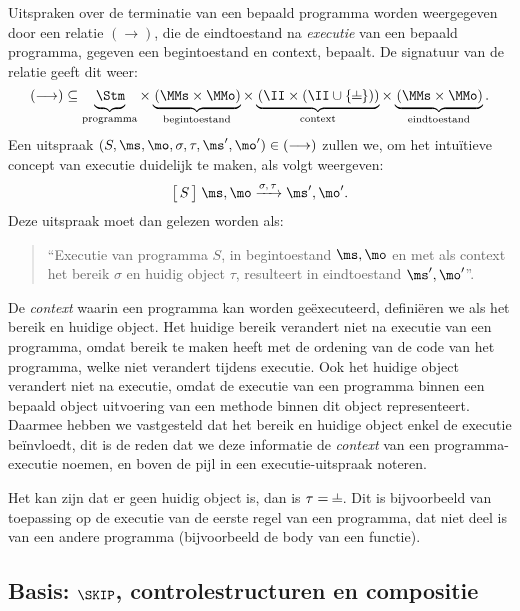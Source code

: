 Uitspraken over de terminatie van een bepaald programma worden weergegeven door een relatie $(\longrightarrow)$, die de eindtoestand na \emph{executie} van een bepaald programma, gegeven een begintoestand en context, bepaalt. De signatuur van de relatie geeft dit weer:
%
\begin{equation*}
  (\longrightarrow)
  \subseteq
  \underbrace{\phantom{|}\!\Stm}_\text{programma} \times
  \underbrace{\phantom{|}\!(\MMs \times \MMo)}_\text{begintoestand} \times
  \underbrace{\phantom{|}\!(\II \times (\II \cup \{\nil\}))}_\text{context} \times
  \underbrace{\phantom{|}\!(\MMs \times \MMo)}_\text{eindtoestand}
  .
\end{equation*}
%
Een uitspraak $(S,\ms,\mo,\sigma,\tau, \ms',\mo') \in (\longrightarrow)$ zullen we, om het intuïtieve concept van executie duidelijk te maken, als volgt weergeven:
%
\begin{equation*}
  \Terminates{S}{\ms,\mo}{\sigma,\tau}{\ms',\mo'}.
\end{equation*}
%
Deze uitspraak moet dan gelezen worden als:

\begin{quote}
  ``Executie van programma $S$, in begintoestand $\ms, \mo$ en met als context het bereik $\sigma$ en huidig object $\tau$, resulteert in eindtoestand $\ms', \mo'$''.
\end{quote}

De \emph{context} waarin een programma kan worden geëxecuteerd, definiëren we als het bereik en huidige object. Het huidige bereik verandert niet na executie van een programma, omdat bereik te maken heeft met de ordening van de code van het programma, welke niet verandert tijdens executie. Ook het huidige object verandert niet na executie, omdat de executie van een programma binnen een bepaald object uitvoering van een methode binnen dit object representeert. Daarmee hebben we vastgesteld dat het bereik en huidige object enkel de executie beïnvloedt, dit is de reden dat we deze informatie de \emph{context} van een programma-executie noemen, en boven de pijl in een executie-uitspraak noteren.

Het kan zijn dat er geen huidig object is, dan is $\tau = \nil$. Dit is bijvoorbeeld van toepassing op de executie van de eerste regel van een programma, dat niet deel is van een andere programma (bijvoorbeeld de body van een functie).

\subsection{Basis: $\SKIP$, controlestructuren en compositie}

